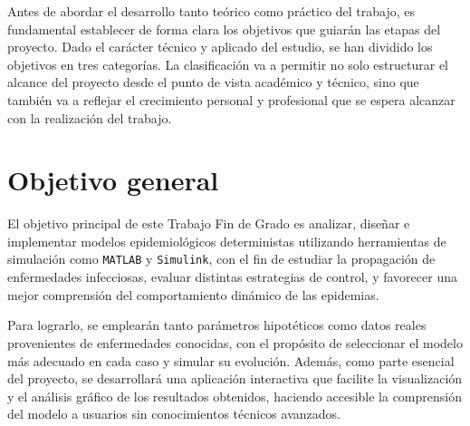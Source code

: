 
Antes de abordar el desarrollo tanto teórico como práctico del trabajo, es fundamental establecer de forma clara los objetivos que guiarán las etapas del proyecto. Dado el carácter técnico y aplicado del estudio, se han dividido los objetivos en tres categorías. La clasificación va a permitir no solo estructurar el alcance del proyecto desde el punto de vista académico y técnico, sino que también va a reflejar el crecimiento personal y profesional que se espera alcanzar con la realización del trabajo.

\section{Objetivo general}
El objetivo principal de este Trabajo Fin de Grado es analizar, diseñar e implementar modelos epidemiológicos deterministas utilizando herramientas de simulación como \texttt{MATLAB} y \texttt{Simulink}, con el fin de estudiar la propagación de enfermedades infecciosas, evaluar distintas estrategias de control, y favorecer una mejor comprensión del comportamiento dinámico de las epidemias.

Para lograrlo, se emplearán tanto parámetros hipotéticos como datos reales provenientes de enfermedades conocidas, con el propósito de seleccionar el modelo más adecuado en cada caso y simular su evolución. Además, como parte esencial del proyecto, se desarrollará una aplicación interactiva que facilite la visualización y el análisis gráfico de los resultados obtenidos, haciendo accesible la comprensión del modelo a usuarios sin conocimientos técnicos avanzados.

